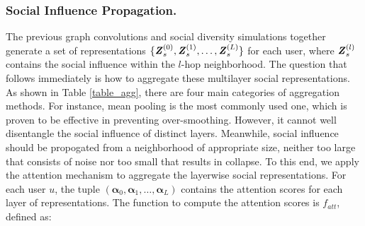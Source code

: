 \documentclass[letterpaper]{article} %
\begin{document}
\subsubsection{Social Influence Propagation.}
The previous graph convolutions and social diversity simulations together generate a set of representations $\{\textbf{\textit{Z}}_s^{(0)}, \textbf{\textit{Z}}_s^{(1)}, \ldots, \textbf{\textit{Z}}_s^{(L)}\}$ for each user, where $\textbf{\textit{Z}}_s^{(l)}$ contains the social influence within the $l$-hop neighborhood. The question that follows immediately is how to aggregate these multilayer social representations. As shown in Table \ref{table_agg}, there are four main categories of aggregation methods. For instance, mean pooling is the most commonly used one, which is proven to be effective in preventing over-smoothing. However, it cannot well disentangle the social influence of distinct layers. Meanwhile, social influence should be propogated from a neighborhood of appropriate size, neither too large that consists of noise nor too small that results in collapse. To this end, we apply the attention mechanism \cite{attention} to aggregate the layerwise social representations. For each user $u$, the tuple $(\boldsymbol{\alpha}_{0},\boldsymbol{\alpha}_{1},\ldots,\boldsymbol{\alpha}_{L})$ contains the attention scores for each layer of representations. The function to compute the attention scores is $f_{att}$, defined as:
\end{document}
